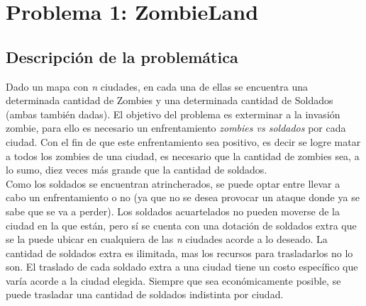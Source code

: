 \documentclass[a4paper]{article}
\begin{document}
\thispagestyle{empty}


\maketitle
\newpage

\thispagestyle{empty}
\vfill
\begin{abstract}
Habi\'endonos sido dado una serie de tres problem\'aticas a resolver, se plantean sus respectivas soluciones acorde a los requisitos pedidos. Se adjunta una descripci\'on de cada problema y su soluci\'on, conjunto a su an\'alisis de correctitud y de complejidad sumado a su experimentaci\'on. El lenguaje elegido para llevar a cabo el trabajo es C++. \textcolor{red}{Poner aca instrucciones de compilaci\'on.}
\end{abstract}

\thispagestyle{empty}
\vspace{3cm}
\tableofcontents
\newpage


\newpage

\section{Problema 1: ZombieLand}

\subsection{Descripci\'on de la problem\'atica}

Dado un mapa con \emph{n} ciudades, en cada una de ellas se encuentra una determinada cantidad de Zombies y una determinada cantidad de Soldados (ambas tambi\'en dadas). El objetivo del problema es exterminar a la invasi\'on zombie, para ello es necesario un enfrentamiento \textit{zombies vs soldados} por cada ciudad. Con el fin de que este enfrentamiento sea positivo, es decir se logre matar a todos los zombies de una ciudad, es necesario que la cantidad de zombies sea, a lo sumo, diez veces m\'as grande que la cantidad de soldados.\\

Como los soldados se encuentran atrincherados, se puede optar entre llevar a cabo un enfrentamiento o no (ya que no se desea provocar un ataque donde ya se sabe que se va a perder). Los soldados acuartelados no pueden moverse de la ciudad en la que est\'an, pero s\'i se cuenta con una dotaci\'on de soldados extra que se la puede ubicar en cualquiera de las \emph{n} ciudades acorde a lo deseado. La cantidad de soldados extra es ilimitada, mas los recursos para trasladarlos no lo son. El traslado de cada soldado extra a una ciudad tiene un costo espec\'ifico que var\'ia acorde a la ciudad elegida. Siempre que sea econ\'omicamente posible, se puede trasladar una cantidad de soldados indistinta por ciudad.\\
\end{document}
